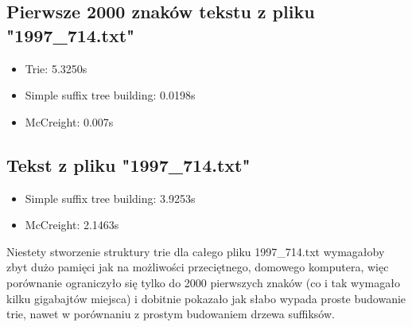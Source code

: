 \documentclass{article}
\begin{document}
	\subsection{Pierwsze 2000 znaków tekstu z pliku "1997\_714.txt"}
		\begin{itemize}
		\item Trie: 5.3250s
		\item Simple suffix tree building: 0.0198s
		\item McCreight: 0.007s
		\end{itemize}
		
	\subsection{Tekst z pliku "1997\_714.txt"}
		\begin{itemize}
		\item Simple suffix tree building: 3.9253s
		\item McCreight: 2.1463s
		\end{itemize}
	
	\noindent Niestety stworzenie struktury trie dla całego pliku 1997\_714.txt wymagałoby zbyt dużo pamięci jak na możliwości przeciętnego, domowego komputera, więc porównanie ograniczyło się tylko do 2000 pierwszych znaków (co i tak wymagało kilku gigabajtów miejsca) i dobitnie pokazało jak słabo wypada proste budowanie trie, nawet w porównaniu z prostym budowaniem drzewa suffiksów.   
	
\end{document}
